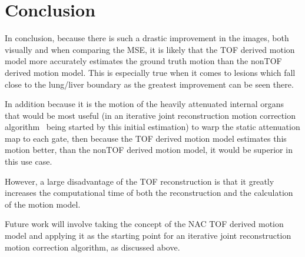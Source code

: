 \documentclass[9pt]{IEEEtran}
\begin{document}
\section{Conclusion}
In conclusion, because there is such a drastic improvement in the images, both visually and when comparing the MSE, it is likely that the TOF derived motion model more accurately estimates the ground truth motion than the nonTOF derived motion model. This is especially true when it comes to lesions which fall close to the lung/liver boundary as the greatest improvement can be seen there.

In addition because it is the motion of the heavily attenuated internal organs that would be most useful (in an iterative joint reconstruction motion correction algorithm~\cite{Bousse2016a} being started by this initial estimation) to warp the static attenuation map to each gate, then because the TOF derived motion model estimates this motion better, than the nonTOF derived motion model, it would be superior in this use case.

However, a large disadvantage of the TOF reconstruction is that it greatly increases the computational time of both the reconstruction and the calculation of the motion model.

Future work will involve taking the concept of the NAC TOF derived motion model and applying it as the starting point for an iterative joint reconstruction motion correction algorithm, as discussed above.

\ifCLASSOPTIONcaptionsoff
  \newpage
\fi



%
%
%
\end{document}
